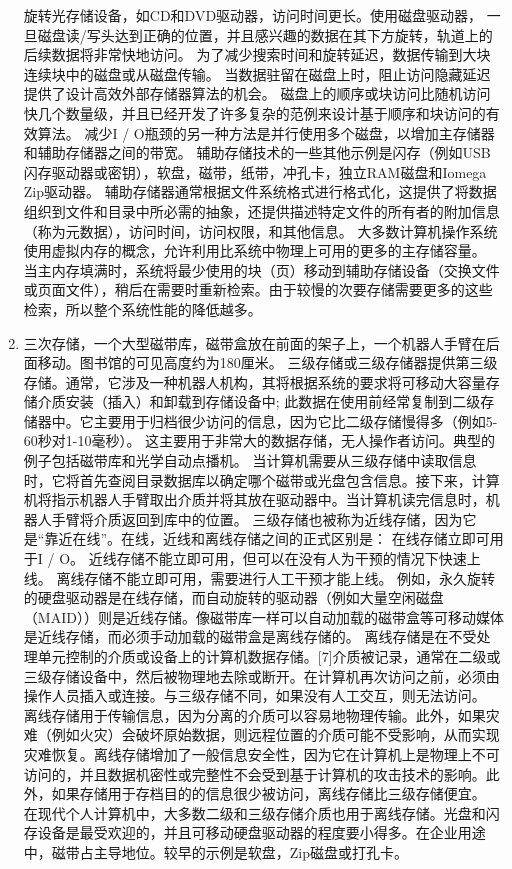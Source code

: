 \begin{enumerate}
	旋转光存储设备，如CD和DVD驱动器，访问时间更长。使用磁盘驱动器，
	一旦磁盘读/写头达到正确的位置，并且感兴趣的数据在其下方旋转，轨道上的后续数据将非常快地访问。
	为了减少搜索时间和旋转延迟，数据传输到大块连续块中的磁盘或从磁盘传输。
	当数据驻留在磁盘上时，阻止访问隐藏延迟提供了设计高效外部存储器算法的机会。
	磁盘上的顺序或块访问比随机访问快几个数量级，并且已经开发了许多复杂的范例来设计基于顺序和块访问的有效算法。
	减少I / O瓶颈的另一种方法是并行使用多个磁盘，以增加主存储器和辅助存储器之间的带宽。
	辅助存储技术的一些其他示例是闪存（例如USB闪存驱动器或密钥），软盘，磁带，纸带，冲孔卡，独立RAM磁盘和Iomega Zip驱动器。
	辅助存储器通常根据文件系统格式进行格式化，这提供了将数据组织到文件和目录中所必需的抽象，还提供描述特定文件的所有者的附加信息（称为元数据），访问时间，访问权限，和其他信息。
	大多数计算机操作系统使用虚拟内存的概念，允许利用比系统中物理上可用的更多的主存储容量。
	当主内存填满时，系统将最少使用的块（页）移动到辅助存储设备（交换文件或页面文件），稍后在需要时重新检索。由于较慢的次要存储需要更多的这些检索，所以整个系统性能的降低越多。
	\item   三次存储，一个大型磁带库，磁带盒放在前面的架子上，一个机器人手臂在后面移动。图书馆的可见高度约为180厘米。
	三级存储或三级存储器提供第三级存储。通常，它涉及一种机器人机构，其将根据系统的要求将可移动大容量存储介质安装（插入）和卸载到存储设备中; 
	此数据在使用前经常复制到二级存储器中。它主要用于归档很少访问的信息，因为它比二级存储慢得多（例如5-60秒对1-10毫秒）。
	这主要用于非常大的数据存储，无人操作者访问。典型的例子包括磁带库和光学自动点播机。
	当计算机需要从三级存储中读取信息时，它将首先查阅目录数据库以确定哪个磁带或光盘包含信息。接下来，计算机将指示机器人手臂取出介质并将其放在驱动器中。当计算机读完信息时，机器人手臂将介质返回到库中的位置。
	三级存储也被称为近线存储，因为它是“靠近在线”。在线，近线和离线存储之间的正式区别是：
	在线存储立即可用于I / O。
	近线存储不能立即可用，但可以在没有人为干预的情况下快速上线。
	离线存储不能立即可用，需要进行人工干预才能上线。
	例如，永久旋转的硬盘驱动器是在线存储，而自动旋转的驱动器（例如大量空闲磁盘（MAID））则是近线存储。像磁带库一样可以自动加载的磁带盒等可移动媒体是近线存储，而必须手动加载的磁带盒是离线存储的。
	离线存储是在不受处理单元控制的介质或设备上的计算机数据存储。[7]介质被记录，通常在二级或三级存储设备中，然后被物理地去除或断开。在计算机再次访问之前，必须由操作人员插入或连接。与三级存储不同，如果没有人工交互，则无法访问。
	离线存储用于传输信息，因为分离的介质可以容易地物理传输。此外，如果灾难（例如火灾）会破坏原始数据，则远程位置的介质可能不受影响，从而实现灾难恢复。离线存储增加了一般信息安全性，因为它在计算机上是物理上不可访问的，并且数据机密性或完整性不会受到基于计算机的攻击技术的影响。此外，如果存储用于存档目的的信息很少被访问，离线存储比三级存储便宜。
	在现代个人计算机中，大多数二级和三级存储介质也用于离线存储。光盘和闪存设备是最受欢迎的，并且可移动硬盘驱动器的程度要小得多。在企业用途中，磁带占主导地位。较早的示例是软盘，Zip磁盘或打孔卡。
\end{enumerate}
